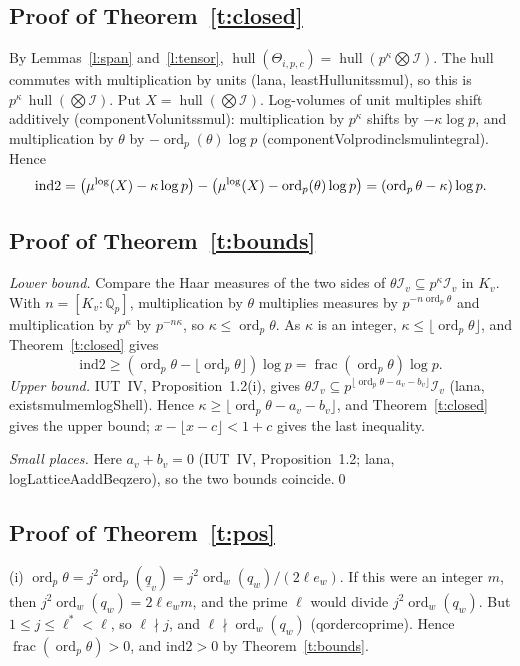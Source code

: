 \documentclass[11pt,a4paper]{article}
\newcommand{\Qp}{\mathbb{Q}_p}
\newcommand{\I}{\mathcal{I}}
\newcommand{\ordp}{\operatorname{ord}_p}
\newcommand{\fr}{\operatorname{frac}}
\newcommand{\hull}{\operatorname{hull}}
\newcommand{\mulog}{\mu^{\log}}
\newcommand{\qb}{\underline{q}}
\newcommand{\itwo}{\mathrm{ind2}}
\newcommand{\leanus}{\textunderscore\allowbreak}
\newcommand{\lean}[1]{{\ttfamily\let\_\leanus #1}}
\theoremstyle{plain}
\theoremstyle{definition}
\theoremstyle{remark}
\begin{document}
\subsection{Proof of Theorem~\ref{t:closed}}
By Lemmas~\ref{l:span} and~\ref{l:tensor}, $\hull(\Theta_{i,p,c})=\hull(p^\kappa\bigotimes\I)$. The hull commutes with
multiplication by units (lana, \lean{leastHull\_units\_smul}), so this is $p^\kappa\,\hull(\bigotimes\I)$. Put
$X=\hull(\bigotimes\I)$. Log-volumes of unit multiples shift additively (\lean{componentVol\_units\_smul}):
multiplication by $p^\kappa$ shifts by $-\kappa\log p$, and multiplication by $\theta$ by $-\ordp(\theta)\log p$
(\lean{componentVol\_prod\_incl\_smul\_integral}). Hence
\[\itwo=\bigl(\mulog(X)-\kappa\log p\bigr)-\bigl(\mulog(X)-\ordp(\theta)\log p\bigr)=(\ordp\theta-\kappa)\log p.\qedhere\]

\subsection{Proof of Theorem~\ref{t:bounds}}
\emph{Lower bound.} Compare the Haar measures of the two sides of $\theta\I_v\subseteq p^\kappa\I_v$ in $K_v$. With
$n=[K_v:\Qp]$, multiplication by $\theta$ multiplies measures by $p^{-n\ordp\theta}$ and multiplication by $p^\kappa$
by $p^{-n\kappa}$, so $\kappa\le\ordp\theta$. As $\kappa$ is an integer, $\kappa\le\lfloor\ordp\theta\rfloor$, and
Theorem~\ref{t:closed} gives
\[\itwo\ge(\ordp\theta-\lfloor\ordp\theta\rfloor)\log p=\fr(\ordp\theta)\log p.\]
\emph{Upper bound.} IUT~IV, Proposition~1.2(i), gives
$\theta\I_v\subseteq p^{\lfloor\ordp\theta-a_v-b_v\rfloor}\I_v$ (lana, \lean{exists\_mul\_mem\_logShell}). Hence $\kappa\ge\lfloor\ordp\theta-a_v-b_v\rfloor$,
and Theorem~\ref{t:closed} gives the upper bound; $x-\lfloor x-c\rfloor<1+c$ gives the last inequality.

\emph{Small places.} Here $a_v+b_v=0$ (IUT~IV, Proposition~1.2; lana, \lean{logLatticeA\_add\_B\_eq\_zero}), so the
two bounds coincide.\qed

\subsection{Proof of Theorem~\ref{t:pos}}
(i) $\ordp\theta=j^2\ordp(\qb_v)=j^2\operatorname{ord}_w(q_w)/(2\ell e_w)$. If this were an integer $m$, then
$j^2\operatorname{ord}_w(q_w)=2\ell e_wm$, and the prime $\ell$ would divide $j^2\operatorname{ord}_w(q_w)$. But
$1\le j\le\ell^*<\ell$, so $\ell\nmid j$, and $\ell\nmid\operatorname{ord}_w(q_w)$ (\lean{q\_order\_coprime}). Hence
$\fr(\ordp\theta)>0$, and $\itwo>0$ by Theorem~\ref{t:bounds}.
\end{document}
